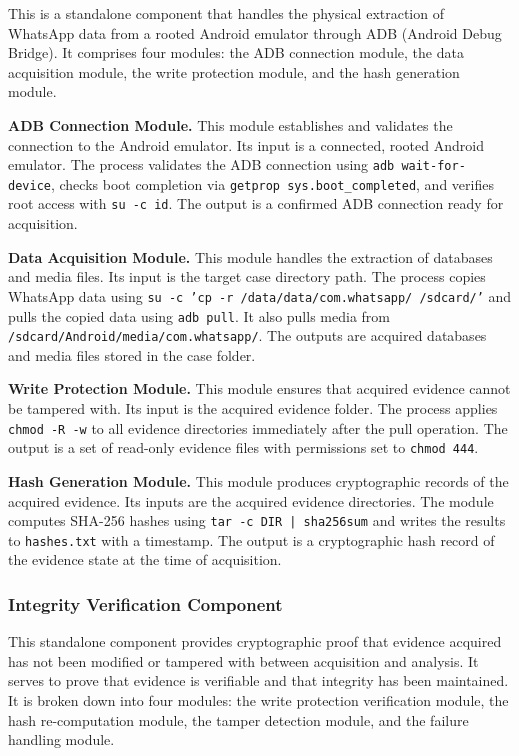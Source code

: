\documentclass[12pt,a4paper]{report}
\begin{document}
This is a standalone component that handles the physical extraction of WhatsApp data from a rooted Android emulator through ADB (Android Debug Bridge). It comprises four modules: the ADB connection module, the data acquisition module, the write protection module, and the hash generation module.

\textbf{ADB Connection Module.} This module establishes and validates the connection to the Android emulator. Its input is a connected, rooted Android emulator. The process validates the ADB connection using \texttt{adb wait-for-device}, checks boot completion via \texttt{getprop sys.boot\_completed}, and verifies root access with \texttt{su -c id}. The output is a confirmed ADB connection ready for acquisition.

\textbf{Data Acquisition Module.} This module handles the extraction of databases and media files. Its input is the target case directory path. The process copies WhatsApp data using \texttt{su -c 'cp -r /data/data/com.whatsapp/ /sdcard/'} and pulls the copied data using \texttt{adb pull}. It also pulls media from \texttt{/sdcard/Android/media/com.whatsapp/}. The outputs are acquired databases and media files stored in the case folder.

\textbf{Write Protection Module.} This module ensures that acquired evidence cannot be tampered with. Its input is the acquired evidence folder. The process applies \texttt{chmod -R -w} to all evidence directories immediately after the pull operation. The output is a set of read-only evidence files with permissions set to \texttt{chmod 444}.

\textbf{Hash Generation Module.} This module produces cryptographic records of the acquired evidence. Its inputs are the acquired evidence directories. The module computes SHA-256 hashes using \texttt{tar -c DIR | sha256sum} and writes the results to \texttt{hashes.txt} with a timestamp. The output is a cryptographic hash record of the evidence state at the time of acquisition.

\subsubsection{Integrity Verification Component}

This standalone component provides cryptographic proof that evidence acquired has not been modified or tampered with between acquisition and analysis. It serves to prove that evidence is verifiable and that integrity has been maintained. It is broken down into four modules: the write protection verification module, the hash re-computation module, the tamper detection module, and the failure handling module.
\end{document}
